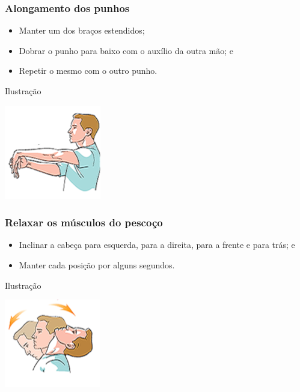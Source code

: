 \documentclass[aspectratio=169]{beamer} %
\begin{document}
\begin{frame}
	\frametitle{Alongamento dos punhos}
	
	\begin{itemize}
		\item Manter um dos bra\c cos estendidos;
		\item Dobrar o punho para baixo com o auxílio da outra mão; e
		\item Repetir o mesmo com o outro punho.
	\end{itemize}
	\vfill
	
	\begin{exampleblock}{Ilustra\c cão}
		\begin{center}
			\includegraphics[scale=0.5]{img/alongamento3}
		\end{center}			
	\end{exampleblock}
\end{frame}

\begin{frame}
	\frametitle{Relaxar os músculos do pesco\c co}
	
	\begin{itemize}
		\item Inclinar a cabe\c ca para esquerda, para a direita, para a frente e para trás; e
		\item Manter cada posi\c cão por alguns segundos.
	\end{itemize}
	\vfill
	
	\begin{exampleblock}{Ilustra\c cão}
		\begin{center}
			\includegraphics[scale=0.5]{img/alongamento4}
		\end{center}			
	\end{exampleblock}
\end{frame}
\end{document}
